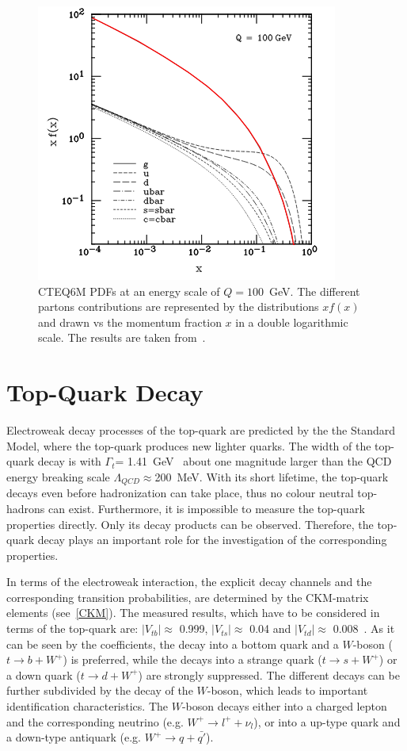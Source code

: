  




\begin{figure}[h]
	\centering
	\includegraphics[width=0.55\linewidth]{Pics/cp1/PDF.png}
	\caption{ CTEQ6M PDFs  at an energy scale of $Q=100$~GeV. The different partons contributions are represented by the distributions $xf(x)$ and drawn vs the momentum fraction $x$ in a double logarithmic scale. The results are taken from~\cite{Pumplin:2002vw}.} 
	\label{fig:PDF}
\end{figure}


\section{Top-Quark Decay}\label{decay1}
Electroweak decay processes of the top-quark are predicted by the the Standard Model, where the top-quark produces new lighter quarks.  
The width of the top-quark decay is with $\Gamma_t$= 1.41~GeV~\cite{Olive:2016xmw} about one magnitude larger than the QCD energy breaking scale $\Lambda_{QCD}\approx$200~MeV. With its short lifetime, the top-quark decays even before  
hadronization can take place, thus no colour neutral top-hadrons can exist. Furthermore,  it is impossible to measure the top-quark properties directly. Only its decay products can be observed. Therefore, the top-quark decay plays an  important role for the investigation of the corresponding properties.


 In terms of the electroweak interaction, the explicit decay channels and the corresponding transition probabilities, are determined by the CKM-matrix elements (see~\cref{CKM}). The measured results, which have to be considered in terms of the top-quark are: $|V_{tb}| \approx$ 0.999,  $|V_{ts}|\approx$ 0.04 and  $|V_{td}|\approx$ 0.008~\cite{Olive:2016xmw}. 
As it can be seen by the coefficients, the decay into a bottom quark and a $W$-boson ($t \rightarrow b + W^+ $) is preferred, while the decays into a strange quark ($t \rightarrow s + W^+ $) or  a down quark ($t \rightarrow d + W^+ $) are strongly suppressed. The different decays can be further subdivided by the decay of the $W$-boson, which leads to important identification characteristics. The $W$-boson decays either into a charged lepton and the corresponding neutrino (e.g. $W^+\rightarrow l^+ + \nu_l$), or into a up-type quark and a down-type antiquark  (e.g. $W^+\rightarrow q + \bar{q'}$). 

